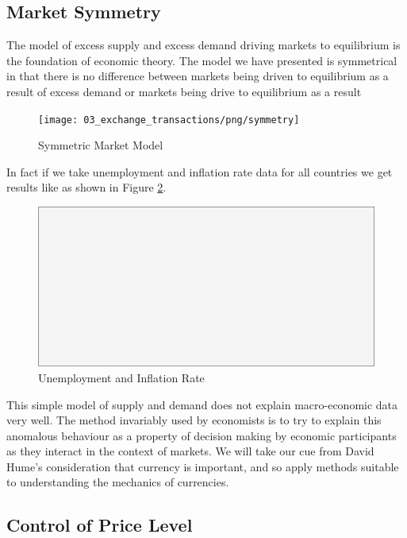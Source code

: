 \subsection{Market Symmetry}

The model of excess supply and excess demand driving markets to equilibrium is the foundation of
economic theory. The model we have presented is symmetrical in that there is no difference between
markets being driven to equilibrium as a result of excess demand or markets being drive to
equilibrium as a result  

\begin{figure}[H]
\centering
\texttt{[image: 03\_exchange\_transactions/png/symmetry]}
\caption{Symmetric Market Model}
\label{fig:symmetric_market_model}
\end{figure}

In fact if we take unemployment and inflation rate data for all countries we get results like as
shown in Figure \ref{fig:ui_summary}.

\begin{figure}[H]
\centering
\includegraphics[scale=0.48]{blank}
\caption{Unemployment and Inflation Rate}
\label{fig:ui_summary}
\end{figure}

This simple model of supply and demand does not explain macro-economic data very well. The method
invariably used by economists is to try to explain this anomalous behaviour as a property of
decision making by economic participants as they interact in the context of markets. We will take
our cue from David Hume's consideration that currency is important, and so apply methods suitable to
understanding the mechanics of currencies.

\subsection{Control of Price Level}
\label{subsection:control_of_price_level}

